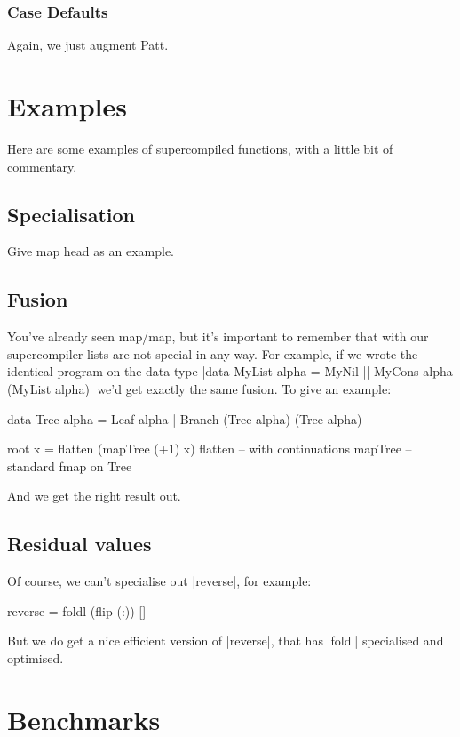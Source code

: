 \documentclass{sigplanconf}
\begin{document}
\subsubsection{Case Defaults}

Again, we just augment Patt.

\section{Examples}

Here are some examples of supercompiled functions, with a little bit of commentary.

\subsection{Specialisation}

Give map head as an example.

\subsection{Fusion}

You've already seen map/map, but it's important to remember that with our supercompiler lists are not special in any way. For example, if we wrote the identical program on the data type |data MyList alpha = MyNil || MyCons alpha (MyList alpha)| we'd get exactly the same fusion. To give an example:

\begin{code}
data Tree alpha = Leaf alpha | Branch (Tree alpha) (Tree alpha)

root x = flatten (mapTree (+1) x)
flatten -- with continuations
mapTree -- standard fmap on Tree
\end{code}

And we get the right result out.

\subsection{Residual values}

Of course, we can't specialise out |reverse|, for example:

\begin{code}
reverse = foldl (flip (:)) []
\end{code}

But we do get a nice efficient version of |reverse|, that has |foldl| specialised and optimised.

\section{Benchmarks}
\label{sec:benchmarks}
\end{document}
